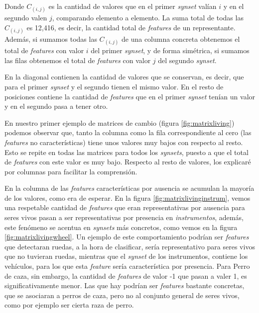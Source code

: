 \documentclass[12,twoside]{TFG-GM}
\theoremstyle{definition}
\theoremstyle{remark}
\begin{document}
Donde $C_{(i,j)}$ es la cantidad de valores que en el primer \textit{synset} valían $i$ y en el segundo valen $j$, comparando elemento a elemento. La suma total de todas las $C_{(i,j)}$ es 12,416, es decir, la cantidad total de \textit{features} de un representante. Además, si sumamos todas las $C_{(i,j)}$ de una columna concreta obtenemos el total de \textit{features} con valor $i$ del primer \textit{synset}, y de forma simétrica, si sumamos las filas obtenemos el total de \textit{features} con valor $j$ del segundo \textit{synset}.


En la diagonal contienen la cantidad de valores que se conservan, es decir, que para el primer \textit{synset} y el segundo tienen el mismo valor. En el resto de posiciones contiene la cantidad de \textit{features} que en el primer \textit{synset} tenían un valor y en el segundo pasa a tener otro.

En nuestro primer ejemplo de matrices de cambio (figura \ref{fig:matrixliving}) podemos observar que, tanto la columna como la fila correspondiente al cero (las \textit{features} no características) tiene unos valores muy bajos con respecto al resto. Esto se repite en todas las matrices para todos los \textit{synsets}, puesto a que el total de \textit{features} con este valor es muy bajo. Respecto al resto de valores, los explicaré por columnas para facilitar la comprensión. 

En la columna de las \textit{features} características por ausencia se acumulan la mayoría de los valores, como era de esperar. En la figura \ref{fig:matrixlivinginstrum}, vemos una respetable cantidad de \textit{features} que eran representativas por ausencia para seres vivos pasan a ser representativas por presencia en \textit{instrumentos}, además, este fenómeno se acentua en \textit{synsets} más concretos, como vemos en la figura \ref{fig:matrixlivingwheel}. Un ejemplo de este comportamiento podrían ser \textit{features} que detectaran ruedas, a la hora de clasificar, sería representativo para seres vivos que no tuvieran ruedas, mientras que el \textit{synset} de los instrumentos, contiene los vehículos, para los que esta \textit{feature} sería característica por presencia.   
Para Perro de caza, sin embargo, la cantidad de \textit{features} de valor -1 que pasan a valer 1, es significativamente menor. Las que hay podrían ser \textit{features} bastante concretas, que se asociaran a perros de caza, pero no al conjunto general de seres vivos, como por ejemplo ser cierta raza de perro. 
\end{document}
